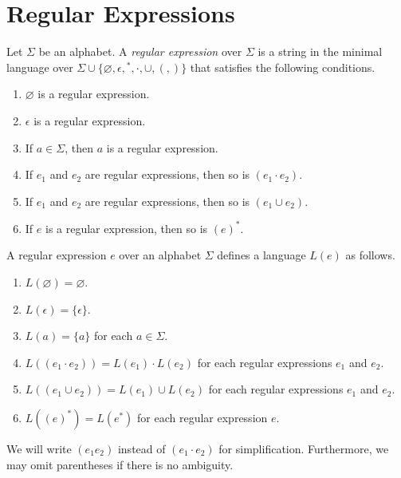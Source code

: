\section{Regular Expressions}
\begin{definition}
  Let $\Sigma$ be an alphabet.
  A \emph{regular expression} over $\Sigma$ is a string in the minimal language
  over $\Sigma \cup \{\varnothing, \epsilon, {}^*, \cdot, \cup, (, )\}$
  that satisfies the following conditions.
  \begin{enumerate}[1.]
    \item $\varnothing$ is a regular expression.
    \item $\epsilon$ is a regular expression.
    \item If $a \in \Sigma$, then $a$ is a regular expression.
    \item If $e_1$ and $e_2$ are regular expressions, then so is
      $(e_1 \cdot e_2)$.
    \item If $e_1$ and $e_2$ are regular expressions, then so is
      $(e_1 \cup e_2)$.
    \item If $e$ is a regular expression, then so is $(e)^*$.
  \end{enumerate}
\end{definition}

\begin{definition}
  A regular expression $e$ over an alphabet $\Sigma$ defines a language $L(e)$
  as follows.
  \begin{enumerate}[1.]
    \item $L(\varnothing) = \varnothing$.
    \item $L(\epsilon) = \{\epsilon\}$.
    \item $L(a) = \{a\}$ for each $a \in \Sigma$.
    \item $L((e_1 \cdot e_2)) = L(e_1) \cdot L(e_2)$ for each regular
      expressions $e_1$ and $e_2$.
    \item $L((e_1 \cup e_2)) = L(e_1) \cup L(e_2)$ for each regular
      expressions $e_1$ and $e_2$.
    \item $L((e)^*) = L(e^*)$ for each regular expression $e$.
  \end{enumerate}
\end{definition}

\begin{remark}
  We will write $(e_1e_2)$ instead of $(e_1 \cdot e_2)$ for simplification.
  Furthermore, we may omit parentheses if there is no ambiguity.
\end{remark}

